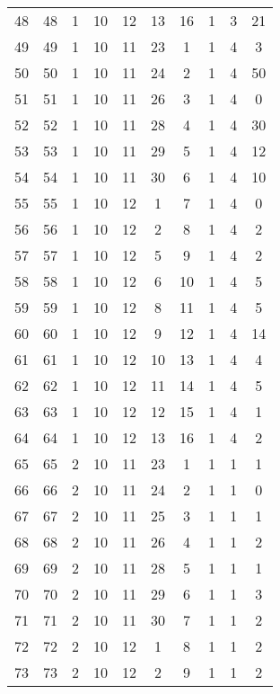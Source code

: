\begin{longtable}{cccccccccc}
  48 &  48 &   1 &  10 &  12 &  13 &  16 &   1 &   3 &  21 \\ 
  49 &  49 &   1 &  10 &  11 &  23 &   1 &   1 &   4 &   3 \\ 
  50 &  50 &   1 &  10 &  11 &  24 &   2 &   1 &   4 &  50 \\ 
  51 &  51 &   1 &  10 &  11 &  26 &   3 &   1 &   4 &   0 \\ 
  52 &  52 &   1 &  10 &  11 &  28 &   4 &   1 &   4 &  30 \\ 
  53 &  53 &   1 &  10 &  11 &  29 &   5 &   1 &   4 &  12 \\ 
  54 &  54 &   1 &  10 &  11 &  30 &   6 &   1 &   4 &  10 \\ 
  55 &  55 &   1 &  10 &  12 &   1 &   7 &   1 &   4 &   0 \\ 
  56 &  56 &   1 &  10 &  12 &   2 &   8 &   1 &   4 &   2 \\ 
  57 &  57 &   1 &  10 &  12 &   5 &   9 &   1 &   4 &   2 \\ 
  58 &  58 &   1 &  10 &  12 &   6 &  10 &   1 &   4 &   5 \\ 
  59 &  59 &   1 &  10 &  12 &   8 &  11 &   1 &   4 &   5 \\ 
  60 &  60 &   1 &  10 &  12 &   9 &  12 &   1 &   4 &  14 \\ 
  61 &  61 &   1 &  10 &  12 &  10 &  13 &   1 &   4 &   4 \\ 
  62 &  62 &   1 &  10 &  12 &  11 &  14 &   1 &   4 &   5 \\ 
  63 &  63 &   1 &  10 &  12 &  12 &  15 &   1 &   4 &   1 \\ 
  64 &  64 &   1 &  10 &  12 &  13 &  16 &   1 &   4 &   2 \\ 
  65 &  65 &   2 &  10 &  11 &  23 &   1 &   1 &   1 &   1 \\ 
  66 &  66 &   2 &  10 &  11 &  24 &   2 &   1 &   1 &   0 \\ 
  67 &  67 &   2 &  10 &  11 &  25 &   3 &   1 &   1 &   1 \\ 
  68 &  68 &   2 &  10 &  11 &  26 &   4 &   1 &   1 &   2 \\ 
  69 &  69 &   2 &  10 &  11 &  28 &   5 &   1 &   1 &   1 \\ 
  70 &  70 &   2 &  10 &  11 &  29 &   6 &   1 &   1 &   3 \\ 
  71 &  71 &   2 &  10 &  11 &  30 &   7 &   1 &   1 &   2 \\ 
  72 &  72 &   2 &  10 &  12 &   1 &   8 &   1 &   1 &   2 \\ 
  73 &  73 &   2 &  10 &  12 &   2 &   9 &   1 &   1 &   2 \\ 

\end{longtable}
